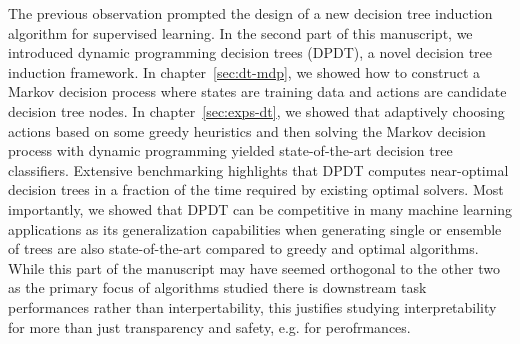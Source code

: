 The previous observation prompted the design of a new decision tree induction algorithm for supervised learning.
In the second part of this manuscript, we introduced dynamic programming decision trees (DPDT), a novel decision tree induction framework.
In chapter~\ref{sec:dt-mdp}, we showed how to construct a Markov decision process where states are training data and actions are candidate decision tree nodes.
In chapter~\ref{sec:exps-dt}, we showed that adaptively choosing actions based on some greedy heuristics and then solving the Markov decision process with dynamic programming yielded state-of-the-art decision tree classifiers.
Extensive benchmarking highlights that DPDT computes near-optimal decision trees in a fraction of the time required by existing optimal solvers.
Most importantly, we showed that DPDT can be competitive in many machine learning applications as its generalization capabilities when generating single or ensemble of trees are also state-of-the-art compared to greedy and optimal algorithms.
While this part of the manuscript may have seemed orthogonal to the other two as the primary focus of algorithms studied there is downstream task performances rather than interpertability, this justifies studying interpretability for more than just transparency and safety, e.g. for perofrmances.


